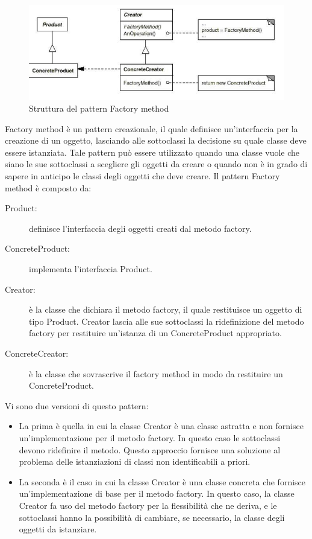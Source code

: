 	 \label{app:factorymethod}
	\begin{figure}[H]\centering
    \includegraphics[scale=0.5]{SpecificaTecnica/Pics/FactoryMethod}
    \caption{Struttura del pattern Factory method}
	\end{figure}
	Factory method è un pattern creazionale, il quale definisce un'interfaccia per la creazione di un oggetto, lasciando alle sottoclassi la decisione su quale classe deve essere istanziata. 
	Tale pattern può essere utilizzato quando una classe vuole che siano le sue sottoclassi a scegliere gli oggetti da creare o quando non è in grado di sapere in anticipo le classi degli oggetti che deve creare.
	Il pattern Factory method è composto da:
	\begin{description}
		\item[Product:] definisce l'interfaccia degli oggetti creati dal metodo factory.
		\item[ConcreteProduct:] implementa l'interfaccia Product.
		\item[Creator:] è la classe che dichiara il metodo factory, il quale restituisce un oggetto di tipo Product. Creator lascia alle sue sottoclassi la ridefinizione del metodo factory per restituire un'istanza di un ConcreteProduct appropriato.
		\item[ConcreteCreator:] è la classe che sovrascrive il factory method in modo da restituire un ConcreteProduct.
	\end{description}
	Vi sono due versioni di questo pattern:
	\begin{itemize}
		\item La prima è quella in cui la classe Creator è una classe astratta e non fornisce un'implementazione per il metodo factory. In questo caso le sottoclassi devono ridefinire il metodo. Questo approccio fornisce una soluzione al problema delle istanziazioni di classi non identificabili a priori. 
		\item La seconda è il caso in cui la classe Creator è una classe concreta che fornisce un'implementazione di base per il metodo factory.
		In questo caso, la classe Creator fa uso del metodo factory per la flessibilità che ne deriva, e le sottoclassi hanno la possibilità di cambiare, se necessario, la classe degli oggetti da istanziare.
	\end{itemize}
